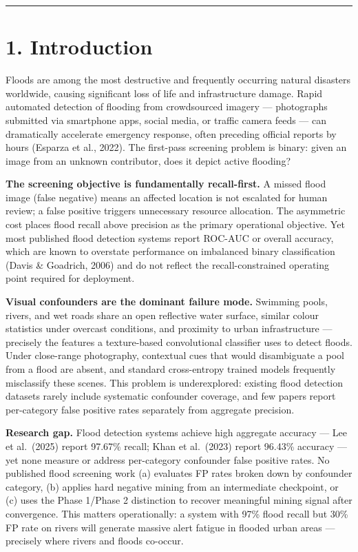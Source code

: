 \documentclass[
  11pt,
]{article}
\newcounter{none} %
\begin{document}
\begin{center}\rule{0.5\linewidth}{0.5pt}\end{center}

\section{1. Introduction}\label{introduction}

Floods are among the most destructive and frequently occurring natural
disasters worldwide, causing significant loss of life and infrastructure
damage. Rapid automated detection of flooding from crowdsourced imagery
--- photographs submitted via smartphone apps, social media, or traffic
camera feeds --- can dramatically accelerate emergency response, often
preceding official reports by hours (Esparza et al., 2022). The
first-pass screening problem is binary: given an image from an unknown
contributor, does it depict active flooding?

\textbf{The screening objective is fundamentally recall-first.} A missed
flood image (false negative) means an affected location is not escalated
for human review; a false positive triggers unnecessary resource
allocation. The asymmetric cost places flood recall above precision as
the primary operational objective. Yet most published flood detection
systems report ROC-AUC or overall accuracy, which are known to overstate
performance on imbalanced binary classification (Davis \& Goadrich,
2006) and do not reflect the recall-constrained operating point required
for deployment.

\textbf{Visual confounders are the dominant failure mode.} Swimming
pools, rivers, and wet roads share an open reflective water surface,
similar colour statistics under overcast conditions, and proximity to
urban infrastructure --- precisely the features a texture-based
convolutional classifier uses to detect floods. Under close-range
photography, contextual cues that would disambiguate a pool from a flood
are absent, and standard cross-entropy trained models frequently
misclassify these scenes. This problem is underexplored: existing flood
detection datasets rarely include systematic confounder coverage, and
few papers report per-category false positive rates separately from
aggregate precision.

\textbf{Research gap.} Flood detection systems achieve high aggregate
accuracy --- Lee et al.~(2025) report 97.67\% recall; Khan et al.~(2023)
report 96.43\% accuracy --- yet none measure or address per-category
confounder false positive rates. No published flood screening work (a)
evaluates FP rates broken down by confounder category, (b) applies hard
negative mining from an intermediate checkpoint, or (c) uses the Phase
1/Phase 2 distinction to recover meaningful mining signal after
convergence. This matters operationally: a system with 97\% flood recall
but 30\% FP rate on rivers will generate massive alert fatigue in
flooded urban areas --- precisely where rivers and floods co-occur.
\end{document}
